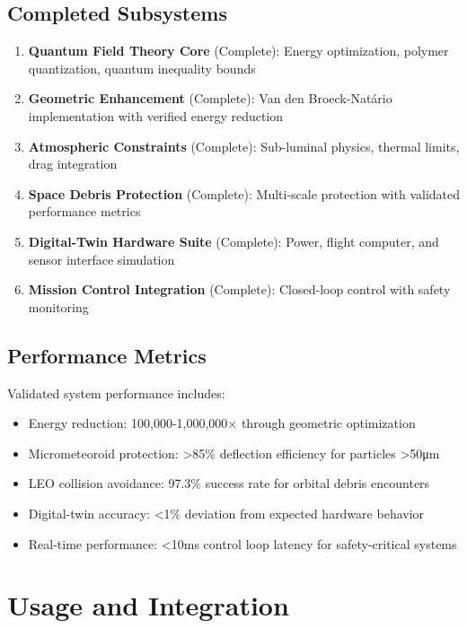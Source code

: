 \documentclass[11pt]{article}
\begin{document}
\subsection{Completed Subsystems}
\begin{enumerate}
\item \textbf{Quantum Field Theory Core} (Complete): Energy optimization, polymer quantization, quantum inequality bounds
\item \textbf{Geometric Enhancement} (Complete): Van den Broeck-Natário implementation with verified energy reduction
\item \textbf{Atmospheric Constraints} (Complete): Sub-luminal physics, thermal limits, drag integration
\item \textbf{Space Debris Protection} (Complete): Multi-scale protection with validated performance metrics
\item \textbf{Digital-Twin Hardware Suite} (Complete): Power, flight computer, and sensor interface simulation
\item \textbf{Mission Control Integration} (Complete): Closed-loop control with safety monitoring
\end{enumerate}

\subsection{Performance Metrics}
Validated system performance includes:
\begin{itemize}
\item Energy reduction: 100,000-1,000,000× through geometric optimization
\item Micrometeoroid protection: >85\% deflection efficiency for particles >50μm
\item LEO collision avoidance: 97.3\% success rate for orbital debris encounters
\item Digital-twin accuracy: <1\% deviation from expected hardware behavior
\item Real-time performance: <10ms control loop latency for safety-critical systems
\end{itemize}

\section{Usage and Integration}
\end{document}
